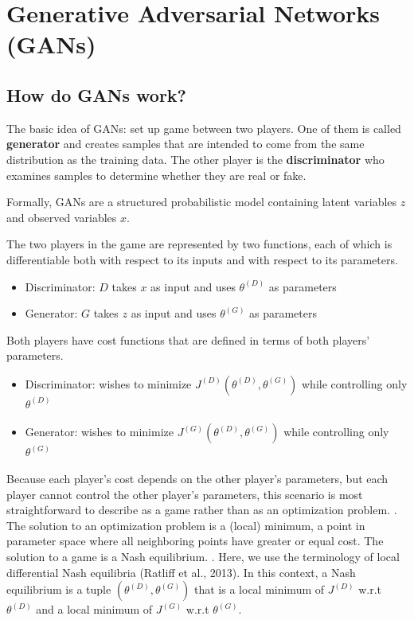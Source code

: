 \documentclass{scrartcl}
\begin{document}
\section[Generative Adversarial Networks (GANs)]{Generative Adversarial Networks (GANs) \cite{goodfellow2016nips}}
\subsection{How do GANs work?}
The basic idea of GANs: set up game between two players. One of them is called \textbf{generator} and creates samples that are intended to come from the same distribution as the training data. The other player is the \textbf{discriminator} who examines samples to determine whether they are real or fake.

Formally, GANs are a structured probabilistic model containing latent variables $z$ and observed variables $x$. 


The two players in the game are represented by two functions, each of which is differentiable both with respect to its inputs and with respect to its parameters.
\begin{itemize}
	\item
		Discriminator: $D$ takes $x$ as input and uses $\theta^{(D)}$ as parameters
	\item
		Generator: $G$ takes $z$ as input and uses $\theta^{(G)}$ as parameters
\end{itemize}

Both players have cost functions that are defined in terms of both players’ parameters.
\begin{itemize}
	\item
		Discriminator: wishes to minimize $J^{(D)}(\theta^{(D)},\theta^{(G)})$ while controlling only $\theta^{(D)}$
	\item
		Generator: wishes to minimize $J^{(G)}(\theta^{(D)},\theta^{(G)})$ while controlling only $\theta^{(G)}$
\end{itemize}


Because each player's cost depends on the other player’s parameters, but each player cannot control the other player’s parameters, this scenario is most straightforward to describe as a game rather than as an optimization problem. . The solution to an optimization problem is a (local) minimum, a point in parameter space where all neighboring points have greater or equal cost. The solution to a game is a Nash equilibrium. . Here, we use the terminology of local differential Nash equilibria
(Ratliff et al., 2013). In this context, a Nash equilibrium is a tuple $(\theta^{(D)},\theta^{(G)})$ that is a local minimum of $J^{(D)}$ w.r.t $\theta^{(D)}$ and a local minimum of $J^{(G)}$ w.r.t $\theta^{(G)}$.
\end{document}
